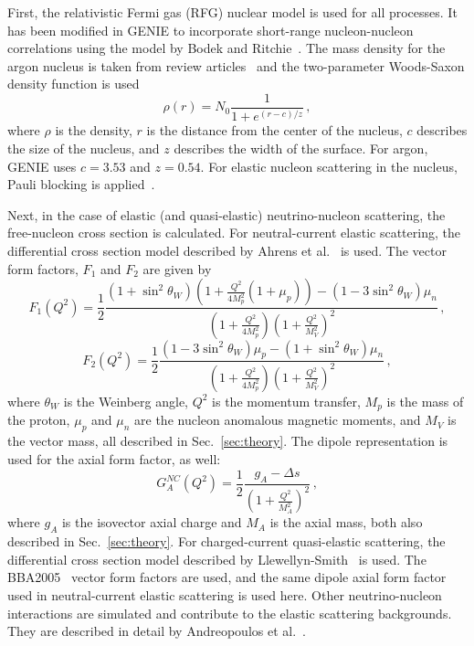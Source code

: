     First, the relativistic Fermi gas (RFG) nuclear model is used for all
    processes. It has been modified in GENIE to incorporate short-range
    nucleon-nucleon correlations using the model by Bodek and
    Ritchie~\cite{BodekrRitchie}. The mass density for the argon nucleus is
    taken from review articles~\cite{nucdensity} and the two-parameter
    Woods-Saxon density function is used~\cite{WoodsSaxon}
    \begin{equation}\label{eq:woodssaxon}
      \rho(r) = N_0\frac{1}{1+e^{(r-c)/z}} \,,
    \end{equation}
    where $\rho$ is the density, $r$ is the distance from the center of the
    nucleus, $c$ describes the size of the nucleus, and $z$ describes the width
    of the surface. For argon, GENIE uses $c=3.53$ and $z=0.54$.  For elastic
    nucleon scattering in the nucleus, Pauli blocking is
    applied~\cite{PauliBlock}.
    
    Next, in the case of elastic (and quasi-elastic) neutrino-nucleon
    scattering, the free-nucleon cross section is calculated. For
    neutral-current elastic scattering, the differential cross section model
    described by Ahrens et al.~\cite{Ahrens} is used. The vector form
    factors, $F_1$ and $F_2$ are given by
    \begin{equation}
      F_1(Q^2) = \frac{1}{2}\frac{(1+\sin^2\theta_W)(1+\frac{Q^2}{4M_p^2}(1+\mu_p)) 
        - (1-3\sin^2\theta_W)\mu_n}
        {(1+\frac{Q^2}{4M_p^2})(1+\frac{Q^2}{M_V^2})^2} \,,
    \end{equation}
    \begin{equation}
      F_2(Q^2) = \frac{1}{2}\frac{(1-3\sin^2\theta_W)\mu_p - (1+\sin^2\theta_W)\mu_n}
         {(1+\frac{Q^2}{4M_p^2})(1+\frac{Q^2}{M_V^2})^2} \,,
    \end{equation}
    where $\theta_W$ is the Weinberg angle, $Q^2$ is the momentum transfer,
    $M_p$ is the mass of the proton, $\mu_p$ and $\mu_n$ are the nucleon
    anomalous magnetic moments, and $M_V$ is the vector mass, all described in
    Sec.~\ref{sec:theory}. The dipole representation is used for the axial
    form factor, as well:
    \begin{equation}
      G_A^{NC}(Q^2) = \frac{1}{2}\frac{g_A - \Delta s}{(1+\frac{Q^2}{M_A^2})^2} \,,
    \end{equation}
    where $g_A$ is the isovector axial charge and $M_A$ is the axial mass, both
    also described in Sec.~\ref{sec:theory}. For charged-current quasi-elastic
    scattering, the differential cross section model described by
    Llewellyn-Smith~\cite{Llewellyn} is used. The BBA2005~\cite{BBA05} vector
    form factors are used, and the same dipole axial form factor used in
    neutral-current elastic scattering is used here. Other neutrino-nucleon
    interactions are simulated and contribute to the elastic scattering
    backgrounds. They are described in detail by Andreopoulos et
    al.~\cite{Andreopoulos:2015wxa}.

